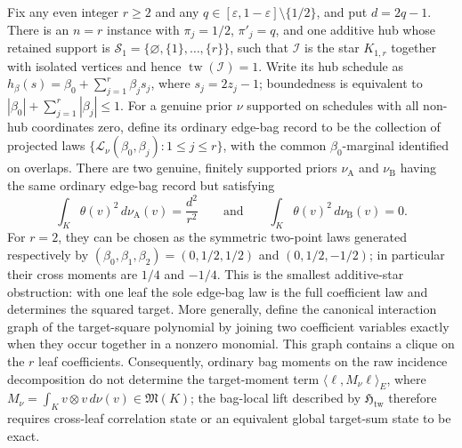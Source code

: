 Fix any even integer \(r\ge 2\) and any \(q\in[\varepsilon,1-\varepsilon]\setminus\{1/2\}\), and put \(d=2q-1\).  There is an \(n=r\) instance with \(\pi_j=1/2\), \(\pi'_j=q\), and one additive hub whose retained support is \(\mathcal S_1=\{\varnothing,\{1\},\ldots,\{r\}\}\), such that \(\mathcal I\) is the star \(K_{1,r}\) together with isolated vertices and hence \(\operatorname{tw}(\mathcal I)=1\).  Write its hub schedule as \(h_\beta(s)=\beta_0+\sum_{j=1}^r\beta_js_j\), where \(s_j=2z_j-1\); boundedness is equivalent to \(|\beta_0|+\sum_{j=1}^r|\beta_j|\le1\).  For a genuine prior \(\nu\) supported on schedules with all non-hub coordinates zero, define its ordinary edge-bag record to be the collection of projected laws \(\{\mathcal L_\nu(\beta_0,\beta_j):1\le j\le r\}\), with the common \(\beta_0\)-marginal identified on overlaps.  There are two genuine, finitely supported priors \(\nu_{\mathrm A}\) and \(\nu_{\mathrm B}\) having the same ordinary edge-bag record but satisfying
\[
 \int_K\theta(v)^2\,d\nu_{\mathrm A}(v)=\frac{d^2}{r^2}
 \qquad\text{and}\qquad
 \int_K\theta(v)^2\,d\nu_{\mathrm B}(v)=0.
\]
For \(r=2\), they can be chosen as the symmetric two-point laws generated respectively by \((\beta_0,\beta_1,\beta_2)=(0,1/2,1/2)\) and \((0,1/2,-1/2)\); in particular their cross moments are \(1/4\) and \(-1/4\).  This is the smallest additive-star obstruction: with one leaf the sole edge-bag law is the full coefficient law and determines the squared target.  More generally, define the canonical interaction graph of the target-square polynomial by joining two coefficient variables exactly when they occur together in a nonzero monomial.  This graph contains a clique on the \(r\) leaf coefficients.  Consequently, ordinary bag moments on the raw incidence decomposition do not determine the target-moment term \(\langle\ell,M_\nu\ell\rangle_E\), where \(M_\nu=\int_K v\otimes v\,d\nu(v)\in\mathfrak M(K)\); the bag-local lift described by \(\mathfrak H_{\mathrm{tw}}\) therefore requires cross-leaf correlation state or an equivalent global target-sum state to be exact.